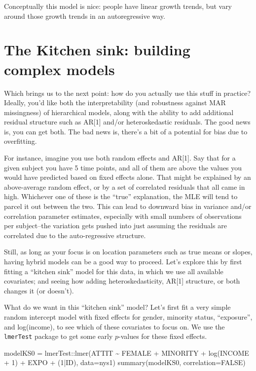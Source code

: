 \documentclass[
  letterpaper,
  DIV=11,
  numbers=noendperiod]{scrreprt}
\newenvironment{Shaded}{}{}
\newcommand{\AttributeTok}[1]{\textcolor[rgb]{0.49,0.56,0.16}{#1}}
\newcommand{\ConstantTok}[1]{\textcolor[rgb]{0.53,0.00,0.00}{#1}}
\newcommand{\DecValTok}[1]{\textcolor[rgb]{0.25,0.63,0.44}{#1}}
\newcommand{\FunctionTok}[1]{\textcolor[rgb]{0.02,0.16,0.49}{#1}}
\newcommand{\NormalTok}[1]{#1}
\newcommand{\OtherTok}[1]{\textcolor[rgb]{0.00,0.44,0.13}{#1}}
\newcommand{\SpecialCharTok}[1]{\textcolor[rgb]{0.25,0.44,0.63}{#1}}
\begin{document}
Conceptually this model is nice: people have linear growth trends, but
vary around those growth trends in an autoregressive way.

\section{The Kitchen sink: building complex
models}\label{the-kitchen-sink-building-complex-models}

Which brings us to the next point: how do you actually use this stuff in
practice? Ideally, you'd like both the interpretability (and robustness
against MAR missingness) of hierarchical models, along with the ability
to add additional residual structure such as AR{[}1{]} and/or
heteroskedastic residuals. The good news is, you can get both. The bad
news is, there's a bit of a potential for bias due to overfitting.

For instance, imagine you use both random effects and AR{[}1{]}. Say
that for a given subject you have 5 time points, and all of them are
above the values you would have predicted based on fixed effects alone.
That might be explained by an above-average random effect, or by a set
of correlated residuals that all came in high. Whichever one of these is
the ``true'' explanation, the MLE will tend to parcel it out between the
two. This can lead to downward bias in variance and/or correlation
parameter estimates, especially with small numbers of observations per
subject--the variation gets pushed into just assuming the residuals are
correlated due to the auto-regressive structure.

Still, as long as your focus is on location parameters such as true
means or slopes, having hybrid models can be a good way to proceed.
Let's explore this by first fitting a ``kitchen sink'' model for this
data, in which we use all available covariates; and seeing how adding
heteroskedasticity, AR{[}1{]} structure, or both changes it (or
doesn't).

What do we want in this ``kitchen sink'' model? Let's first fit a very
simple random intercept model with fixed effects for gender, minority
status, ``exposure'', and log(income), to see which of these covariates
to focus on. We use the \texttt{lmerTest} package to get some early
\(p\)-values for these fixed effects.

\begin{Shaded}
\begin{Highlighting}[]
\NormalTok{modelKS0 }\OtherTok{=}\NormalTok{ lmerTest}\SpecialCharTok{::}\FunctionTok{lmer}\NormalTok{(ATTIT }\SpecialCharTok{\textasciitilde{}}\NormalTok{ FEMALE }\SpecialCharTok{+}\NormalTok{ MINORITY }\SpecialCharTok{+} \FunctionTok{log}\NormalTok{(INCOME }\SpecialCharTok{+} \DecValTok{1}\NormalTok{) }\SpecialCharTok{+}\NormalTok{ EXPO }\SpecialCharTok{+}\NormalTok{ (}\DecValTok{1}\SpecialCharTok{|}\NormalTok{ID), }\AttributeTok{data=}\NormalTok{nys1)}
\FunctionTok{summary}\NormalTok{(modelKS0, }\AttributeTok{correlation=}\ConstantTok{FALSE}\NormalTok{)}
\end{Highlighting}
\end{Shaded}
\end{document}
